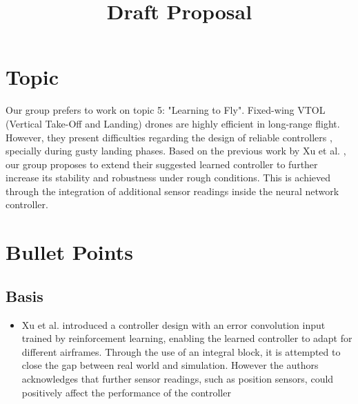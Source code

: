 \documentclass[conference, onecolumn]{IEEEtran}
\begin{document}
\title{Draft Proposal}

\author{
\and
{}

}

\maketitle



\section{Topic}
Our group prefers to work on topic 5: "Learning to Fly". Fixed-wing VTOL (Vertical Take-Off and Landing) drones are highly efficient in long-range flight. However, they present difficulties regarding the design of reliable controllers \cite{b1}, specially during gusty landing phases.
Based on the previous work by Xu et al. \cite{b2}, our group proposes to extend their suggested learned controller to further increase its stability and robustness under rough conditions. This is achieved through the integration of additional sensor readings inside the neural network controller.

\section{Bullet Points}

\subsection{Basis}
\begin{itemize}
  \item Xu et al. \cite{b2} introduced a controller design with an error convolution input trained by reinforcement learning, enabling the learned controller to adapt for different airframes. Through the use of an integral block, it is attempted to close the gap between real world and simulation. However the authors acknowledges that further sensor readings, such as position sensors, could positively affect the performance of the controller

\end{itemize}
\end{document}
